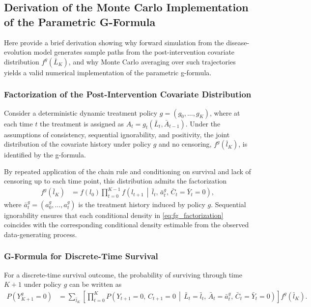 \subsection{Derivation of the Monte Carlo Implementation of the Parametric G-Formula}
\label{app:gformula_derivation}

Here provide a brief derivation showing why forward simulation from
the disease-evolution model generates sample paths from the post-intervention
covariate distribution $f^g(\bar{L}_K)$, and why Monte Carlo averaging over such
trajectories yields a valid numerical implementation of the parametric g-formula.

\subsubsection{Factorization of the Post-Intervention Covariate Distribution}

Consider a deterministic dynamic treatment policy
$g = (g_0,\ldots,g_K)$, where at each time $t$ the treatment is assigned as
$A_t = g_t(\bar{L}_t,\bar{A}_{t-1})$.
Under the assumptions of consistency, sequential ignorability, and positivity,
the joint distribution of the covariate history under policy $g$ and no censoring,
$f^g(\bar{l}_K)$, is identified by the g-formula.

By repeated application of the chain rule and conditioning on survival and lack
of censoring up to each time point, this distribution admits the factorization
\begin{align}
f^g(\bar{l}_K)
&=
f(l_0)
\prod_{t=0}^{K-1}
f\!\left(
l_{t+1}
\,\middle|\,
\bar{l}_t,\,
\bar{a}^g_t,\,
\bar{C}_t = \bar{Y}_t = 0
\right),
\label{eq:fg_factorization}
\end{align}
where $\bar{a}^g_t = (a^g_0,\ldots,a^g_t)$ is the treatment history induced by policy
$g$. Sequential ignorability ensures that each conditional density in
\eqref{eq:fg_factorization} coincides with the corresponding conditional density
estimable from the observed data-generating process.

\subsubsection{G-Formula for Discrete-Time Survival}

For a discrete-time survival outcome, the probability of surviving through time
$K+1$ under policy $g$ can be written as
\begin{align}
P(Y^g_{K+1} = 0)
&=
\sum_{\bar{l}_K}
\left[
\prod_{t=0}^{K}
P\!\left(
Y_{t+1} = 0,\,
C_{t+1} = 0
\,\middle|\,
\bar{L}_t = \bar{l}_t,\,
\bar{A}_t = \bar{a}^g_t,\,
\bar{C}_t = \bar{Y}_t = 0
\right)
\right]
f^g(\bar{l}_K).
\label{eq:gformula_survival}
\end{align}

